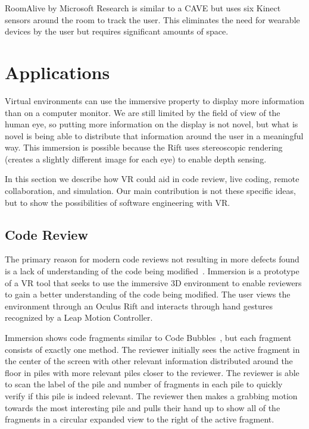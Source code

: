 \documentclass[conference]{IEEEtran}
\begin{document}
RoomAlive by Microsoft Research is similar to a CAVE but uses six Kinect sensors around the room to track the user.  This eliminates the need for wearable devices by the user but requires significant amounts of space.~\cite{Jones:RoomAlive}

\section{Applications}
Virtual environments can use the immersive property to display more information than on a computer monitor. 
We are still limited by the field of view of the human eye, so putting more information on the display is not novel, but what is novel is being able to distribute that information around the user in a meaningful way. 
This immersion is possible because the Rift uses stereoscopic rendering (creates a slightly different image for each eye) to enable depth sensing.

In this section we describe how VR could aid in code review, live coding, remote collaboration, and simulation. 
Our main contribution is not these specific ideas, but to show the possibilities of software engineering with VR.

\subsection{Code Review}
The primary reason for modern code reviews not resulting in more defects found is a lack of understanding of the code being modified~\cite{bacchelli:ModernCodeReviewChallenges}. 
Immersion is a prototype of a VR tool that seeks to use the immersive 3D environment to enable reviewers to gain a better understanding of the code being modified. 
The user views the environment through an Oculus Rift and interacts through hand gestures recognized by a Leap Motion Controller.

Immersion shows code fragments similar to Code Bubbles~\cite{Bragdon:CodeBubbles}, but each fragment consists of exactly one method.  
The reviewer initially sees the active fragment in the center of the screen with other relevant information distributed around the floor in piles with more relevant piles closer to the reviewer. 
The reviewer is able to scan the label of the pile and number of fragments in each pile to quickly verify if this pile is indeed relevant. 
The reviewer then makes a grabbing motion towards the most interesting pile and pulls their hand up to show all of the fragments in a circular expanded view to the right of the active fragment.
\end{document}
